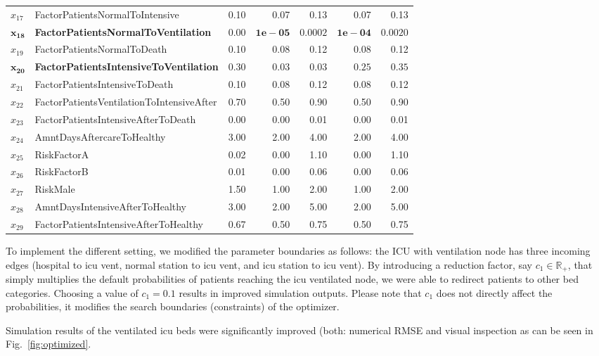 \documentclass[conference]{IEEEtran}
\begin{document}
\begin{table}[ht]
\begin{tabular}{llrrrrr}
$x_{17}$&   FactorPatientsNormalToIntensive & 0.10 & 0.07 & 0.13 & 0.07 & 0.13 \\ 
$\mathbf{x_{18}}$&   \textbf{FactorPatientsNormalToVentilation} & $\mathbf{0.00}$ & $\mathbf{1e-05}$ & $\mathbf{0.0002}$ & $\mathbf{1e-04}$ & $\mathbf{ 0.0020}$ \\ 
$x_{19}$&   FactorPatientsNormalToDeath & 0.10 & 0.08 & 0.12 & 0.08 & 0.12 \\ 
$\mathbf{x_{20}}$&   \textbf{FactorPatientsIntensiveToVentilation} & $\mathbf{0.30}$ & $\mathbf{0.03}$ & $\mathbf{0.03}$ & $\mathbf{0.25}$ & $\mathbf{0.35}$ \\ 
$x_{21}$&   FactorPatientsIntensiveToDeath & 0.10 & 0.08 & 0.12 & 0.08 & 0.12 \\ 
$x_{22}$&   FactorPatientsVentilationToIntensiveAfter & 0.70 & 0.50 & 0.90 & 0.50 & 0.90 \\ 
$x_{23}$&   FactorPatientsIntensiveAfterToDeath & 0.00 & 0.00 & 0.01 & 0.00 & 0.01 \\ 
$x_{24}$&   AmntDaysAftercareToHealthy & 3.00 & 2.00 & 4.00 & 2.00 & 4.00 \\ 
$x_{25}$&   RiskFactorA & 0.02 & 0.00 & 1.10 & 0.00 & 1.10 \\ 
$x_{26}$&   RiskFactorB & 0.01 & 0.00 & 0.06 & 0.00 & 0.06 \\ 
$x_{27}$&   RiskMale & 1.50 & 1.00 & 2.00 & 1.00 & 2.00 \\ 
$x_{28}$&   AmntDaysIntensiveAfterToHealthy & 3.00 & 2.00 & 5.00 & 2.00 & 5.00 \\ 
$x_{29}$&   FactorPatientsIntensiveAfterToHealthy & 0.67 & 0.50 & 0.75 & 0.50 & 0.75 \\ 
   \hline
\end{tabular}
\end{table}


To implement the different setting, we modified the parameter boundaries as follows: the ICU with ventilation node has three incoming edges (hospital to icu vent, normal station to icu vent, and icu station to icu vent).
By introducing a reduction factor, say  $c_1 \in \mathbb{R_+}$, that simply multiplies the default probabilities of patients reaching the icu ventilated node, we were able to redirect patients to other bed categories. 
Choosing a value of $c_1=0.1$ results in improved simulation outputs. Please note that $c_1$ does not directly affect the probabilities, it modifies the search boundaries (constraints) of the optimizer.

Simulation results of the ventilated icu beds were significantly improved (both: numerical RMSE and visual inspection as can be seen in Fig.~\ref{fig:optimized}.
\end{document}
